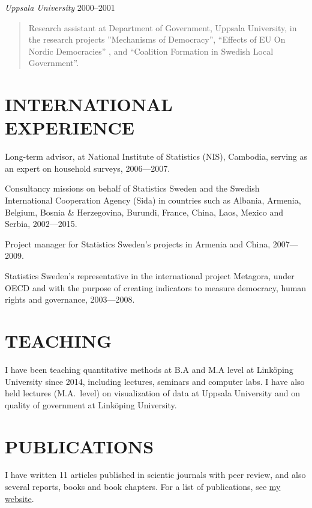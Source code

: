 \documentclass[11pt,]{article}
\begin{document}
\emph{Uppsala University} \hfill 2000--2001

\begin{quote}
Research assistant at Department of Government, Uppsala University, in
the research projects ''Mechanisms of Democracy'', ``Effects of EU On
Nordic Democracies'' , and ``Coalition Formation in Swedish Local
Government''.
\end{quote}

\hypertarget{international-experience}{%
\section{INTERNATIONAL EXPERIENCE}\label{international-experience}}

Long-term advisor, at National Institute of Statistics (NIS), Cambodia,
serving as an expert on household surveys, 2006---2007.

Consultancy missions on behalf of Statistics Sweden and the Swedish
International Cooperation Agency (Sida) in countries such as Albania,
Armenia, Belgium, Bosnia \& Herzegovina, Burundi, France, China, Laos,
Mexico and Serbia, 2002---2015.

Project manager for Statistics Sweden's projects in Armenia and China,
2007---2009.

Statistics Sweden's representative in the international project
Metagora, under OECD and with the purpose of creating indicators to
measure democracy, human rights and governance, 2003---2008.

\hypertarget{teaching}{%
\section{TEACHING}\label{teaching}}

I have been teaching quantitative methods at B.A and M.A level at
Linköping University since 2014, including lectures, seminars and
computer labs. I have also held lectures (M.A.~level) on visualization
of data at Uppsala University and on quality of government at Linköping
University.

\hypertarget{publications}{%
\section{PUBLICATIONS}\label{publications}}

I have written 11 articles published in scientic journals with peer
review, and also several reports, books and book chapters. For a list of
publications, see
\href{https://richardohrvall.rbind.io/en/publication/}{my website}.
\end{document}
